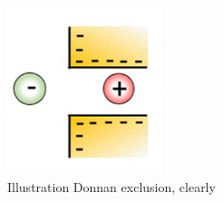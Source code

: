 \begin{figure}
    \centering
    \includegraphics[width=0.4\textwidth]{Billeder/teori/donnan_exclusion.png}
    \caption{Illustration Donnan exclusion, clearly}
    \label{fig:donnan_exclusion}
\end{figure}











